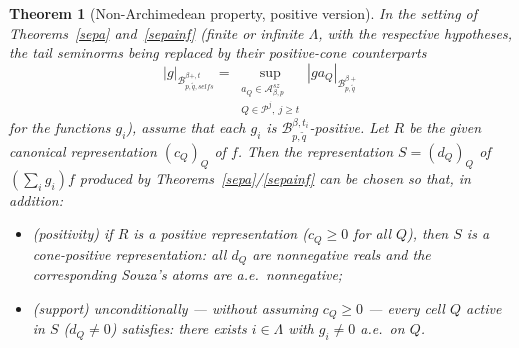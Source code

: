 \documentclass[11pt]{amsart}
\newtheorem{theorem}{Theorem}[section]
\theoremstyle{definition}
\begin{document}
\begin{theorem}[Non-Archimedean property, positive version]\label{posrem}
In the setting of Theorems~\ref{sepa} and~\ref{sepainf} (finite or infinite
$\Lambda$, with the respective hypotheses, the tail seminorms being replaced
by their positive-cone counterparts
$$|g|_{\mathcal{B}^{\beta+,t}_{p,\tilde q,selfs}}
=\sup_{\substack{ a_Q \in \mathcal{A}^{sz}_{\beta,p}\\ Q\in \mathcal{P}^j,\ j\geq t}} |ga_Q|_{\mathcal{B}^{\beta+}_{p,\tilde q}}$$
for the functions $g_i$), assume that each $g_i$ is
$\mathcal{B}^{\beta,t_i}_{p,\tilde q}$-positive. Let $R$ be the given
canonical representation $(c_Q)_Q$ of $f$. Then the representation
$S=(d_Q)_Q$ of $(\sum_i g_i)f$ produced by
Theorems~\ref{sepa}/\ref{sepainf} can be chosen so that, in addition:
\begin{itemize}
\item[i.] ({\it positivity}) if $R$ is a positive representation
($c_Q \geq 0$ for all $Q$), then $S$ is a cone-positive representation: all
$d_Q$ are nonnegative reals and the corresponding Souza's atoms are a.e.\
nonnegative;
\item[ii.] ({\it support}) unconditionally --- without assuming $c_Q\geq 0$
--- every cell $Q$ active in $S$ ($d_Q \neq 0$) satisfies: there exists
$i \in \Lambda$ with $g_i \neq 0$ a.e.\ on $Q$.
\end{itemize}
\end{theorem}
\end{document}
